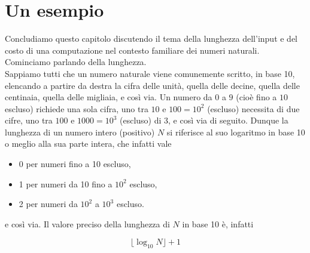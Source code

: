 \section{Un esempio}

Concludiamo questo capitolo discutendo il tema della lunghezza dell'input
e del costo di una computazione nel contesto familiare dei numeri naturali.
Cominciamo parlando della lunghezza.\\
Sappiamo tutti che un numero naturale viene comunemente scritto, in base 10,
elencando a partire da destra la cifra delle unità, quella delle decine, quella
delle centinaia, quella delle migliaia, e così via. Un numero da $0$ a $9$
(cioè fino a $10$ escluso) richiede una sola cifra, uno tra $10$ e $100 = 10^2$
(escluso) necessita di due cifre, uno tra $100$ e $1000 = 10^3$ (escluso) di 3,
e così via di seguito. Dunque la lunghezza di un numero intero (positivo) $N$ si
riferisce al suo logaritmo in base 10 o meglio alla sua parte intera, che infatti
vale

\begin{itemize}
    \item 0 per numeri fino a 10 escluso,
    \item 1 per numeri da 10 fino a $10^2$ escluso,
    \item 2 per numeri da $10^2$ a $10^3$ escluso.
\end{itemize}

e così via. Il valore preciso della lunghezza di $N$ in base 10 è, infatti

$$
    \lfloor \log_{10} N \rfloor + 1
$$

